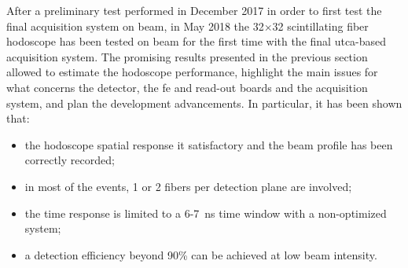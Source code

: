 After a preliminary test performed in December 2017 in order to first test the final acquisition system on beam, in May 2018 the 32$\times$32 scintillating fiber hodoscope has been tested on beam for the first time with the final \gls{utca}-based acquisition system. The promising results presented in the previous section allowed to estimate the hodoscope performance, highlight the main issues for what concerns the detector, the \gls{fe} and read-out boards and the acquisition system, and plan the development advancements.
In particular, it has been shown that:
\begin{itemize}
\item the hodoscope spatial response it satisfactory and the beam profile has been correctly recorded;
\item in most of the events, 1 or 2 fibers per detection plane are involved;
\item the time response is limited to a 6-7~ns time window with a non-optimized system;
\item a detection efficiency beyond 90\% can be achieved at low beam intensity.
\end{itemize}

